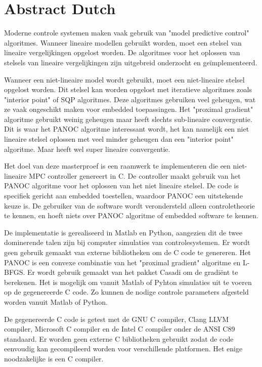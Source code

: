 \chapter{Abstract Dutch}
Moderne controle systemen maken vaak gebruik van "model predictive control" algoritmes. Wanneer lineaire modellen gebruikt worden, moet een stelsel van lineaire vergelijkingen opgelost worden. De algoritmes voor het oplossen van stelsels van lineaire vergelijkingen zijn uitgebreid onderzocht en ge\"{i}mplementeerd. 

Wanneer een niet-lineaire model wordt gebruikt, moet een niet-lineaire stelsel opgelost worden. Dit stelsel kan worden opgelost met iteratieve algoritmes zoals "interior point" of SQP algoritmes. Deze algoritmes gebruiken veel geheugen, wat ze vaak ongeschikt maken voor embedded toepassingen. Het "proximal gradient" algoritme gebruikt weinig geheugen maar heeft slechts sub-lineaire convergentie. Dit is waar het PANOC algoritme interessant wordt, het kan namelijk een niet lineaire stelsel oplossen met veel minder geheugen dan een "interior point" algoritme. Maar heeft wel super lineaire convergentie. 

Het doel van deze masterproef is een raamwerk te implementeren die een niet-lineaire MPC controller genereert in C. De controller maakt gebruik van het PANOC algoritme voor het oplossen van het niet lineaire stelsel. De code is specifiek gericht aan embedded toestellen, waardoor PANOC een uitstekende keuze is. De gebruiker van de software wordt verondersteld alleen controletheorie te kennen, en hoeft niets over PANOC algoritme of embedded software te kennen.

De implementatie is gerealiseerd in Matlab en Python, aangezien dit de twee dominerende talen zijn bij computer simulaties van controlesystemen. Er wordt geen gebruik gemaakt van externe bibliotheken om de C code te genereren. Het PANOC is een convexe combinatie van het "proximal gradient" algoritme en L-BFGS. Er wordt gebruik gemaakt van het pakket Casadi om de gradi\"{e}nt te berekenen. Het is mogelijk om vanuit Matlab of Pyhton simulaties uit te voeren op de gegenereerde C code. Zo kunnen de nodige controle parameters afgesteld worden vanuit Matlab of Python.

De gegenereerde C code is getest met de GNU C compiler, Clang LLVM compiler, Microsoft C compiler en de Intel C compiler onder de ANSI C89 standaard. Er worden geen externe C bibliotheken gebruikt zodat de code eenvoudig kan gecompileerd worden voor verschillende platformen. Het enige noodzakelijke is een C compiler.

